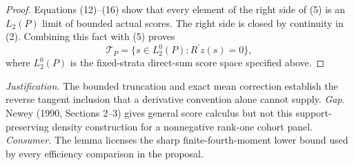 \documentclass{article}
\begin{document}
\begin{proof}
Equations (12)--(16) show that every element of the right side of (5) is an \(L_2(P)\) limit of bounded actual scores.  The right side is closed by continuity in (2).  Combining this fact with (5) proves
\[
\mathcal T_P=\{s\in L_2^0(P):R^{\prime}z(s)=0\},
\]
where \(L_2^0(P)\) is the fixed-strata direct-sum score space specified above.
\end{proof}
\par\smallskip\noindent \textit{Justification.} The bounded truncation and exact mean correction establish the reverse tangent inclusion that a derivative convention alone cannot supply. \textit{Gap.} Newey (1990, Sections 2--3) gives general score calculus but not this support-preserving density construction for a nonnegative rank-one cohort panel. \textit{Consumer.} The lemma licenses the sharp finite-fourth-moment lower bound used by every efficiency comparison in the proposal.
\end{document}
